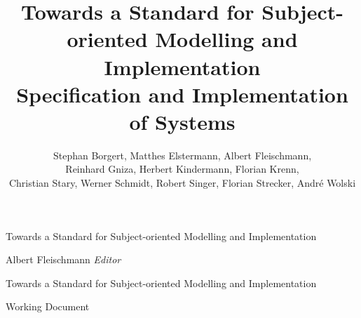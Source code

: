 \documentclass[11pt, showtrims, final, oldfontcommands]{memoir}
\title{Towards a Standard for Subject-oriented Modelling and Implementation\\ Specification and Implementation of Systems}
\author{Stephan Borgert, Matthes Elstermann, Albert Fleischmann, \\ Reinhard Gniza, Herbert Kindermann, Florian Krenn,\\ Christian Stary, Werner Schmidt, Robert Singer, Florian Strecker, Andr\'e Wolski}
\begin{document}
\frontmatter

\pagestyle{empty}

\vspace*{3cm}
\begin{adjustwidth}{0cm}{-3cm}
	\begin{flushright}
		\LARGE\textsf {Towards a Standard for Subject-oriented Modelling and Implementation}
	\end{flushright}
\end{adjustwidth}
\vspace*{\fill}
\cleardoublepage

\vspace*{0cm}
\begin{flushleft}
	\Large\textsf{Albert Fleischmann \textit{Editor}}\par
\end{flushleft}
\vspace{2cm}
\begin{flushleft}
	\Huge\textsf{Towards a Standard for Subject-oriented Modelling and Implementation}\par
	\bigskip\bigskip
	\Large\textsf{Working Document}
\end{flushleft}
\vspace{2.5cm}
\begin{flushleft}
\end{flushleft}
\vspace*{\fill}
\clearpage
\end{document}
